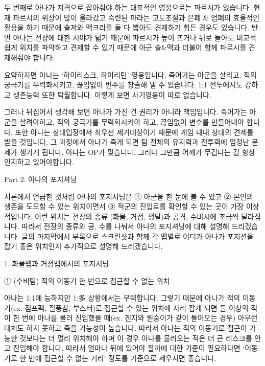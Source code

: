  

두 번째로 아나가 저격으로 잡아줘야 하는 대표적인 영웅으로는 파르시가 있습니다. 현재 파르시의 위상이 많이 올라갔고 숙련된 파라는 고도조절과 은폐 & 엄폐의 효율적인 활용을 하기 때문에 솔져와 맥크리를 둘 다 뽑아도 견제하기 힘든 경우도 있습니다. 반면 아나는 전장에 대한 시야가 넓기 때문에 파르시가 높이 뜨거나 뒤로 돌아도 비교적 쉽게 위치를 파악하고 견제할 수 있기 때문에 아군 솔&맥과 더불어 함께 파르시를 견제해줘야 합니다.

 

 

요약하자면 아나는 ‘하이리스크, 하이리턴’ 영웅입니다. 죽어가는 아군을 살리고, 적의 궁극기를 무력화시키고, 끊임없이 변수를 창출해 낼 수 있습니다. 1:1 전투에서도 강하고 생존능력 또한 탁월합니다. 이렇게 보면 사기영웅이 따로 없습니다.

 

그러나 뒤집어서 생각해 보면 아나가 가진 건 권리가 아니라 책임입니다. 죽어가는 아군을 살려야하고, 적의 궁극기를 무력화시켜야 하고, 끊임없이 변수를 만들어내야 합니다. 또한 아나는 상대입장에서 최우선 제거대상이기 때문에 게임 내내 상대의 견제를 받을 것입니다. 그 과정에서 아나가 죽게 되면 팀 전체의 유지력과 전투력에 엄청난 문제가 생기게 됩니다. 아나는 OP가 맞습니다. 그러나 그만큼 어깨가 무겁다는 걸 항상 인지하고 있어야합니다.

 

 

 

Part 2. 아나의 포지셔닝

 

서론에서 언급한 것처럼 아나의 포지셔닝은 ① 아군을 한 눈에 볼 수 있고 ② 본인의 생존을 도모할 수 있는 위치이면서 ③ 적군의 진입로를 확인할 수 있는 곳이 가장 이상적입니다. 이런 위치는 전장의 종류 (화물, 거점, 쟁탈)과 공격, 수비시에 조금씩 달라집니다. 따라서 전장의 종류와 공, 수를 나눠서 아나의 포지셔닝에 대해 설명해 드리겠습니다. 글의 마지막에서 부록으로 스크린샷과 함께 각 맵별로 어디가 아나가 포지션을 잡기 좋은 위치인지 추가적으로 설명해 드리겠습니다.

 

1. 화물맵과 거점맵에서의 포지셔닝

 

① (수비팀) 적의 이동기 한 번으로 접근할 수 없는 위치

아나는 1:1에 능하지만 1:多 상황에서는 무력합니다. 그렇기 때문에 아나가 적의 이동기(ex. 점프팩, 질풍참, 부스터)로 접근할 수 있는 위치에 자리 잡게 되면 둘 이상의 적이 한 번에 아나를 물러 진입했을 때(ex. 겐지와 원숭이가 같이 들어오는 경우) 아무런 대처도 하지 못하고 죽을 가능성이 높습니다. 따라서 아나는 적의 이동기로 접근이 가능한 것보다는 더 멀리 위치해야 하며 이 경우 아나를 물러오는 적은 더 큰 리스크를 안고 진입해야 합니다. 따라서 얼마나 뒤에 있어야 할까에 대한 기준이 필요하다면 ‘이동기로 한 번에 접근할 수 없는 거리’ 정도를 기준으로 세우시면 좋습니다.

